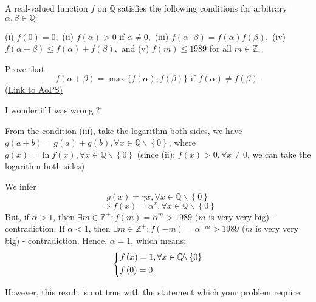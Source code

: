 \begin{problem}
	A real-valued function $ f$ on $ \mathbb{Q}$ satisfies the following conditions for arbitrary $ \alpha, \beta \in \mathbb{Q}:$

(i) $ f(0) = 0,$
(ii) $ f(\alpha) > 0$ if $\alpha \neq 0,$
(iii) $ f(\alpha \cdot \beta) = f(\alpha)f(\beta),$ 
(iv) $ f(\alpha + \beta) \leq f(\alpha) + f(\beta),$ and
(v) $ f(m) \leq 1989$ for all $m \in  \mathbb{Z}.$

Prove that \[ f(\alpha + \beta) = \max\{f(\alpha), f(\beta)\} \text{ if } f(\alpha) \neq f(\beta).\]
	\flushright \href{https://artofproblemsolving.com/community/c6h449061}{(Link to AoPS)}
\end{problem}



\begin{solution}
	I wonder if I was wrong ?!

From the condition (iii), take the logarithm both sides, we have $g\left( {a + b} \right) = g\left( a \right) + g\left( b \right),\forall x \in \mathbb{Q}\backslash \left\{ 0 \right\}$, where $g\left( x \right) = \ln f\left( x \right),\forall x \in \mathbb{Q}\backslash \left\{ 0 \right\}$
(since (ii): $f(x)>0, \forall x \ne 0$, we can take the logarithm both sides)

We infer
\[g\left( x \right) = \gamma x,\forall x \in \mathbb{Q}\backslash \left\{ 0 \right\}\]
\[ \Rightarrow f\left( x \right) = {\alpha ^x},\forall x \in \mathbb{Q}\backslash \left\{ 0 \right\}\]
But, if $\alpha >1$, then $\exists m \in {\mathbb{Z}^ + }:f\left( m \right) = {\alpha ^m} > 1989$ ($m$ is very very big) - contradiction.
If $\alpha <1$, then $\exists m \in {\mathbb{Z}^ + }:f\left( -m \right) = {\alpha ^{-m}} > 1989$ ($m$ is very very big) - contradiction.
Hence, $\alpha =1$, which means:
\[\left\{ \begin{gathered}
  f\left( x \right) = 1,\forall x \in \mathbb{Q}\backslash \left\{ 0 \right\} \hfill \\
  f\left( 0 \right) = 0 \hfill \\ 
\end{gathered}  \right.\]

However, this result is not true with the statement which your problem require.
\end{solution}



